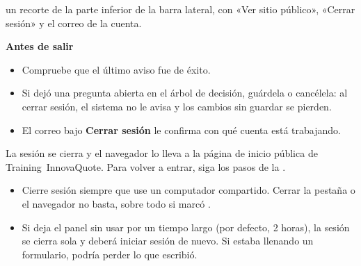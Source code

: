   {un recorte de la parte inferior de la barra lateral, con «Ver sitio público», «Cerrar
   sesión» y el correo de la cuenta.}
  {\textbf{Antes de salir}

   \begin{itemize}
     \item Compruebe que el último aviso fue de éxito.
     \item Si dejó una pregunta abierta en el árbol de decisión, guárdela o cancélela: al cerrar
           sesión, el sistema no le avisa y los cambios sin guardar se pierden.
     \item El correo bajo \textbf{Cerrar sesión} le confirma con qué cuenta está trabajando.
   \end{itemize}}

\begin{resultado}
La sesión se cierra y el navegador lo lleva a la página de inicio pública de Training~InnovaQuote. Para
volver a entrar, siga los pasos de la .
\end{resultado}

\begin{consejo}
\begin{itemize}
  \item Cierre sesión siempre que use un computador compartido. Cerrar la pestaña o el
        navegador no basta, sobre todo si marcó .
  \item Si deja el panel sin usar por un tiempo largo (por defecto, 2 horas), la sesión se
        cierra sola y deberá iniciar sesión de nuevo. Si estaba llenando un formulario, podría
        perder lo que escribió.
\end{itemize}
\end{consejo}

\newcommand{\caprefclaro}[1]{\hyperref[#1]{\textcolor{cielo}{\fontseries{sb}\selectfont capítulo~\ref*{#1}}}}

